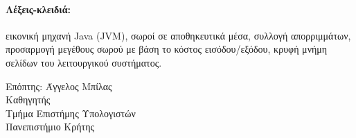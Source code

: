 {  \paragraph{{\selectfont Λέξεις-κλειδιά:}} εικονική μηχανή \selam Java (JVM)\selg, σωροί σε αποθηκευτικά μέσα, συλλογή απορριμμάτων, προσαρμογή μεγέθους σωρού με βάση το κόστος εισόδου/εξόδου, κρυφή μνήμη σελίδων του λειτουργικού συστήματος.

  \begin{center}
	  Επόπτης: Άγγελος Μπίλας \\ Καθηγητής \\ Τμήμα Επιστήμης Υπολογιστών \\ Πανεπιστήμιο Κρήτης
  \end{center}

 }

\selam



